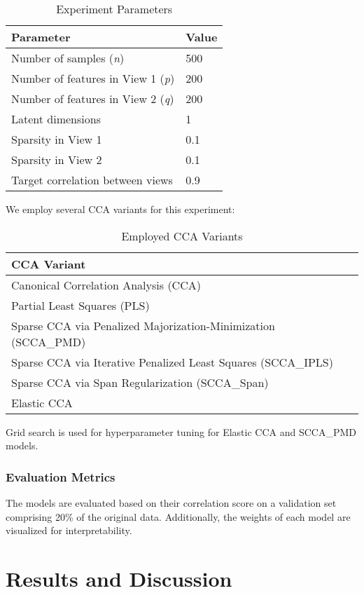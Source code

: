 \begin{table}[h]
\centering
\caption{Experiment Parameters}
\begin{tabular}{l|l}
\textbf{Parameter} & \textbf{Value} \\
\hline
Number of samples (\textit{n}) & 500 \\
Number of features in View 1 (\textit{p}) & 200 \\
Number of features in View 2 (\textit{q}) & 200 \\
Latent dimensions & 1 \\
Sparsity in View 1 & 0.1 \\
Sparsity in View 2 & 0.1 \\
Target correlation between views & 0.9 \\
\end{tabular}
\label{table:experiment-parameters}
\end{table}

We employ several CCA variants for this experiment:

\begin{table}[h]
\centering
\caption{Employed CCA Variants}
\begin{tabular}{l}
\textbf{CCA Variant} \\
\hline
Canonical Correlation Analysis (CCA) \\
Partial Least Squares (PLS) \\
Sparse CCA via Penalized Majorization-Minimization (SCCA\_PMD) \\
Sparse CCA via Iterative Penalized Least Squares (SCCA\_IPLS) \\
Sparse CCA via Span Regularization (SCCA\_Span) \\
Elastic CCA \\
\end{tabular}
\label{table:cca-variants}
\end{table}

Grid search is used for hyperparameter tuning for Elastic CCA and SCCA\_PMD models.

\subsubsection{Evaluation Metrics}

The models are evaluated based on their correlation score on a validation set comprising 20\% of the original data. Additionally, the weights of each model are visualized for interpretability.

\section{Results and Discussion}

